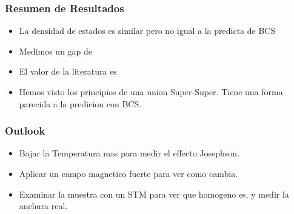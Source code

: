 
\frame
{
  \frametitle{Resumen de Resultados}
        \begin{itemize}
     \item<1-> La densidad de estados es similar pero no igual a la predicta de BCS
     \item<2-> Medimos un gap de 
     \item<3-> El valor de la literatura es
     \item<4-> Hemos visto los principios de una union Super-Super. Tiene una forma parecida a la predicion con BCS.
     \end{itemize}
}


\frame
{
  \frametitle{Outlook}
     \begin{itemize}
     \item<1-> Bajar la Temperatura mas para medir el effecto Josephson.
     \item<2-> Aplicar un campo magnetico fuerte para ver como cambia.
     \item<3-> Examinar la muestra con un STM para ver que homogeno es, y medir la anchura real.
     \end{itemize}
}



